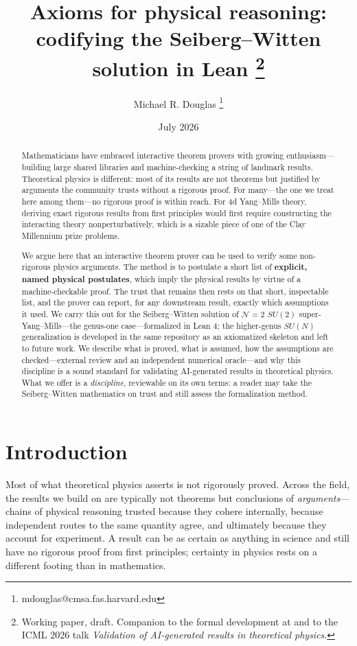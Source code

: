 \documentclass{article}
\title{Axioms for physical reasoning:\\ codifying the Seiberg--Witten solution in Lean%
  \thanks{Working paper, draft. Companion to the formal development at
  \href{https://github.com/mrdouglasny/seiberg-witten}{\code{mrdouglasny/seiberg-witten}}
  and to the ICML 2026 talk \emph{Validation of AI-generated results in theoretical physics}.}}
\author[1]{Michael R. Douglas \thanks{mdouglas@cmsa.fas.harvard.edu}}
\affil[1]{Center Of Mathematical Sciences And Applications, Harvard University, Cambridge, MA 02138 USA}
\date{July 2026}
\theoremstyle{plain}
\theoremstyle{definition}
\numberwithin{equation}{section}
\begin{document}
\maketitle

\begin{abstract}
Mathematicians have embraced interactive theorem provers with growing enthusiasm---building large
shared libraries and machine-checking a string of landmark results. Theoretical physics is
different: most of its results are not theorems but justified by arguments the community trusts
without a rigorous proof. For many---the one we treat here among them---no rigorous
proof is within reach. For 4d Yang--Mills theory, deriving exact rigorous results from first principles
would first require constructing the interacting theory nonperturbatively, which is a sizable piece of
one of the Clay Millennium prize problems. 

We argue here that an interactive theorem prover can be used to verify some non-rigorous physics arguments.
The method is to postulate a short list of \textbf{explicit, named physical
postulates}, which imply the physical results by virtue of a machine-checkable proof.
The trust that remains then rests on that short, inspectable list, and the prover can
report, for any downstream result, exactly which assumptions it used. We carry this out for
the Seiberg--Witten solution of $\mathcal{N}=2$ $SU(2)$ super-Yang--Mills---the genus-one
case---formalized in Lean 4; the higher-genus $SU(N)$ generalization is developed in the same
repository as an axiomatized skeleton and left to future work. We describe what is proved, what is assumed, how the assumptions are checked---external
review and an independent numerical oracle---and why this discipline is a sound standard for
validating AI-generated results in theoretical physics. What we offer is a \emph{discipline},
reviewable on its own terms: a reader may take the Seiberg--Witten mathematics on trust and
still assess the formalization method.
\end{abstract}

\tableofcontents

\section{Introduction}

Most of what theoretical physics asserts is not rigorously proved. Across the field, the results we build on
are typically not theorems but conclusions of \emph{arguments}---chains of physical reasoning
trusted because they cohere internally, because independent routes to the same quantity agree, and
ultimately because they account for experiment. A result can be as certain as anything in science
and still have no rigorous proof from first principles; certainty in physics rests on a different footing
than in mathematics.
\end{document}
